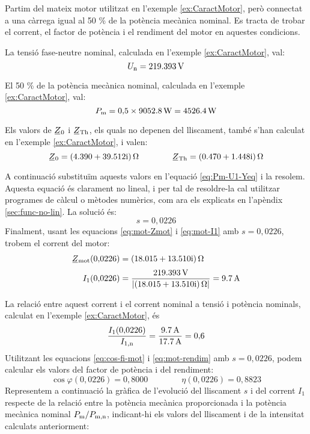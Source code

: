\begin{exemple}\label{ex:MotCarregaReduida}
	\addcontentsxms{\MotCarregaReduida}
	Partim del mateix motor utilitzat en l'exemple \vref{ex:CaractMotor}, però connectat a una càrrega igual  al 50 \% de la potència mecànica nominal. Es tracta de trobar el corrent, el factor de potència i el rendiment del motor en aquestes condicions.

	La tensió  fase-neutre  nominal, calculada  en l'exemple \ref{ex:CaractMotor}, val: 
	\[
		U_\mathrm{n} = \qty{219,393}{V}
	\]
	
	El 50 \% de la potència mecànica nominal, calculada  en l'exemple \ref{ex:CaractMotor}, val:
	\[
		P_\mathrm{m} =  0{,}5\times\qty{9052,8}{W} = \qty{4526,4}{W}
	\]

	Els valors de $\cmplx{Z}_0$ i  $\cmplx{Z}\ped{Th}$, els quals no depenen del lliscament, també s'han calculat en  l'exemple \ref{ex:CaractMotor}, i valen:
	\[
       \cmplx{Z}_0 =  \complexqty{4,390+j39,512}{\ohm} 
       \qquad \qquad
       \cmplx{Z}\ped{Th} = \complexqty{0,470+j1,448}{\ohm} 
	\]
	
	A continuació  substituïm aquests valors en l'equació \eqref{eq:Pm-U1-Yeq} i la resolem.  Aquesta equació és clarament no lineal, i per tal de resoldre-la cal utilitzar programes de càlcul o mètodes numèrics, com ara els explicats en l'apèndix \ref{sec:func-no-lin}. La solució és:
	\[
		s = 0{,}0226
	\]
	Finalment, usant les equacions \eqref{eq:mot-Zmot} i \eqref{eq:mot-I1} amb $s  = 0{,}0226$,  trobem el corrent del motor:
	\begin{align*}
	\cmplx{Z}\ped{mot}(0{,}0226) &=  \complexqty{18,015+j13,510}{\ohm} \\[0.5ex]
	I_1(0{,}0226) &= \frac{\qty{219,393}{V}}{|\complexqty{18,015+j13,510}{\ohm}|} = \qty{9,7}{A}
	\end{align*}
	
	La relació entre aquest  corrent i el corrent nominal a tensió i potència nominals, calculat en l'exemple \ref{ex:CaractMotor}, és
	\[
	\frac{I_1(0{,}0226)}{I_\mathrm{1,n}} = \frac{\qty{9,7}{A}}{\qty{17,7}{A}} = 0{,}6
	\]
	Utilitzant les equacions  \eqref{eq:cos-fi-mot} i \eqref{eq:mot-rendim} amb $s  = 0{,}0226$, podem calcular els valors del factor de potència i del rendiment:
	\[
		\cos\varphi(0{,}0226) =  0{,}8000 \qquad \qquad
		\eta(0{,}0226) =  0{,}8823
	\]
	Representem a continuació la gràfica de l'evolució del lliscament $s$ i del corrent $I_1$ respecte de la relació entre la potència mecànica proporcionada i la potència mecànica nominal $P_\mathrm{m}/P_\mathrm{m,n}$, indicant-hi els valors del lliscament i de la intensitat calculats anteriorment:
	\begin{center}
		
	\end{center}


\end{exemple}
